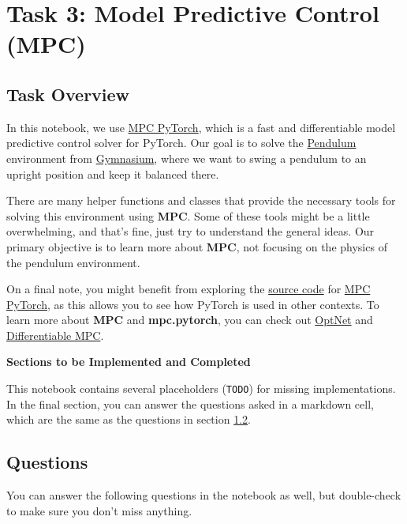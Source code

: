 \section{Task 3: Model Predictive Control (MPC)}

\subsection{Task Overview} In this notebook, we use \href{https://locuslab.github.io/mpc.pytorch/}{MPC PyTorch}, which is a fast and differentiable model predictive control solver for PyTorch. 
Our goal is to solve the \href{https://gymnasium.farama.org/environments/classic_control/pendulum/}{Pendulum} environment from \href{https://gymnasium.farama.org}{Gymnasium}, where we want to swing a pendulum to an upright position and keep it balanced there.

There are many helper functions and classes that provide the necessary tools for solving this environment using \textbf{MPC}. Some of these tools might be a little overwhelming, and that's fine, just try to understand the general ideas. Our primary objective is to learn more about \textbf{MPC}, not focusing on the physics of the pendulum environment.

On a final note, you might benefit from exploring the \href{https://github.com/locuslab/mpc.pytorch/}{source code} for \href{https://locuslab.github.io/mpc.pytorch/}{MPC PyTorch}, as this allows you to see how PyTorch is used in other contexts. To learn more about \textbf{MPC} and \textbf{mpc.pytorch}, you can check out \href{https://arxiv.org/abs/1703.00443}{OptNet} and \href{https://arxiv.org/abs/1810.13400}{Differentiable MPC}.

\textbf{Sections to be Implemented and Completed}

This notebook contains several placeholders (\texttt{TODO}) for missing implementations. In the final section, you can answer the questions asked in a markdown cell, which are the same as the questions in section \ref{sec:mpc-questions}.

\subsection{Questions}\label{sec:mpc-questions} 
You can answer the following questions in the notebook as well, but double-check to make sure you don't miss anything.
